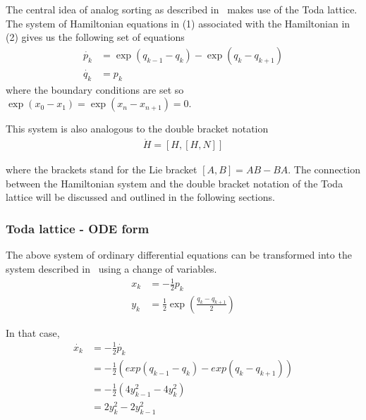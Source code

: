 

% 




The central idea of analog sorting as described in~\cite{bloch, brockett} makes use of the Toda lattice. The system of Hamiltonian equations in (1) associated with the Hamiltonian in (2) gives us the following set of equations
\begin{align*}
\dot{p_k} &= \exp(q_{k-1}-q_{k})-\exp(q_{k}-q_{k+1}) \\
\dot{q_k} &= p_k
\end{align*}
where the boundary conditions are set so $\exp(x_0-x_1)=\exp (x_n-x_{n+1})=0$.

This system is also analogous to the double bracket notation 
\begin{align}
\dot{H} = [H,[H,N]]
\end{align}

where the brackets stand for the Lie bracket $[A,B] = AB-BA$. The connection between the Hamiltonian system  and the double bracket notation of the Toda lattice will be discussed and outlined in the following sections.

\subsubsection{Toda lattice - ODE form}

The above system of ordinary differential equations can be transformed into the system described in~\cite{harvard_robo} using a change of variables.
\begin{align}
x_k &= -\frac{1}{2}p_k \nonumber \\
y_k &= \frac{1}{2}\exp(\frac{q_k-q_{k+1}}{2})
\end{align}

In that case, 
\begin{align*}
    \dot{x_k} &= -\frac{1}{2}\dot{p_k} \\
              &= -\frac{1}{2}(exp(q_{k-1}-q_{k})-exp(q_{k}-q_{k+1})) \\
              &= -\frac{1}{2}(4y^2_{k-1}-4y^2_k) \\
              &= 2y^2_k-2y^2_{k-1}
\end{align*}

